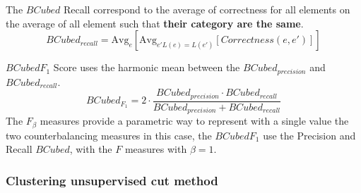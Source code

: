 \begin{definition}
  The $BCubed$ Recall correspond to the average of correctness for all elements on the average of all element such that \textbf{their category are the same}.
  \begin{equation}
    BCubed_{recall} = \text{Avg}_{e}[\text{Avg}_{e' L(e)=L(e')}[Correctness(e, e')]]
  \end{equation}
\end{definition}

\begin{definition}
  $BCubed F_1$ Score uses the harmonic mean between the $BCubed_{precision}$ and $BCubed_{recall}$.
  \begin{equation}
    BCubed_{F_1} =
    2 \cdot \frac{BCubed_{precision} \cdot BCubed_{recall}}
    {BCubed_{precision} + BCubed_{recall}}
  \end{equation}
  The $F_\beta$ measures provide a parametric way to represent with a single value the two counterbalancing measures in this case, the $BCubed F_1$ use the Precision and Recall $BCubed$, with the $F$ measures with $\beta = 1$.
\end{definition}

\subsubsection{Clustering unsupervised cut method}



